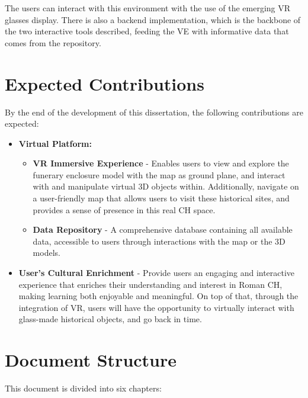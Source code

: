 The users can interact with this environment with the use of the emerging \gls{VR} glasses display.
There is also a backend implementation, which is the backbone of the two interactive tools described, feeding the \gls{VE} with informative data that comes from the repository.

\section{Expected Contributions}
\label{sec:expected_contributions}


By the end of the development of this dissertation, the following contributions are expected:


\begin{itemize}
   \item \textbf{Virtual Platform:}
   \begin{itemize}
      \item \textbf{\gls{VR} Immersive Experience} - Enables users to view and explore the funerary enclosure model with the map as ground plane, and interact with and manipulate virtual \gls{3D} objects within. Additionally, navigate on a user-friendly map that allows users to visit these historical sites, and provides a sense of presence in this real \gls{CH} space.
      \item  \textbf{Data Repository} - A comprehensive database containing all available data, accessible to users through interactions with the map or the \gls{3D} models.
   \end{itemize}
   \item \textbf{User's Cultural Enrichment} - Provide users an engaging and interactive experience that enriches their understanding and interest
   in Roman \gls{CH}, making learning both enjoyable and meaningful.
   On top of that, through the integration of \gls{VR}, users will have the opportunity to virtually interact with glass-made historical objects, and go back in time.
\end{itemize}


\section{Document Structure}
\label{sec:document_structure}


This document is divided into six chapters:

